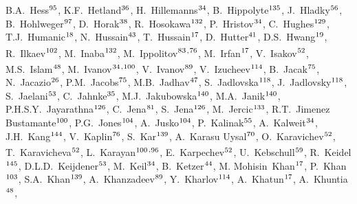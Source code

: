 \begin{flushleft}
B.A.~Hess$^\textrm{\scriptsize 95}$,
K.F.~Hetland$^\textrm{\scriptsize 36}$,
H.~Hillemanns$^\textrm{\scriptsize 34}$,
B.~Hippolyte$^\textrm{\scriptsize 135}$,
J.~Hladky$^\textrm{\scriptsize 56}$,
B.~Hohlweger$^\textrm{\scriptsize 97}$,
D.~Horak$^\textrm{\scriptsize 38}$,
R.~Hosokawa$^\textrm{\scriptsize 132}$,
P.~Hristov$^\textrm{\scriptsize 34}$,
C.~Hughes$^\textrm{\scriptsize 129}$,
T.J.~Humanic$^\textrm{\scriptsize 18}$,
N.~Hussain$^\textrm{\scriptsize 43}$,
T.~Hussain$^\textrm{\scriptsize 17}$,
D.~Hutter$^\textrm{\scriptsize 41}$,
D.S.~Hwang$^\textrm{\scriptsize 19}$,
R.~Ilkaev$^\textrm{\scriptsize 102}$,
M.~Inaba$^\textrm{\scriptsize 132}$,
M.~Ippolitov$^\textrm{\scriptsize 83}$\textsuperscript{,}$^\textrm{\scriptsize 76}$,
M.~Irfan$^\textrm{\scriptsize 17}$,
V.~Isakov$^\textrm{\scriptsize 52}$,
M.S.~Islam$^\textrm{\scriptsize 48}$,
M.~Ivanov$^\textrm{\scriptsize 34}$\textsuperscript{,}$^\textrm{\scriptsize 100}$,
V.~Ivanov$^\textrm{\scriptsize 89}$,
V.~Izucheev$^\textrm{\scriptsize 114}$,
B.~Jacak$^\textrm{\scriptsize 75}$,
N.~Jacazio$^\textrm{\scriptsize 26}$,
P.M.~Jacobs$^\textrm{\scriptsize 75}$,
M.B.~Jadhav$^\textrm{\scriptsize 47}$,
S.~Jadlovska$^\textrm{\scriptsize 118}$,
J.~Jadlovsky$^\textrm{\scriptsize 118}$,
S.~Jaelani$^\textrm{\scriptsize 53}$,
C.~Jahnke$^\textrm{\scriptsize 35}$,
M.J.~Jakubowska$^\textrm{\scriptsize 140}$,
M.A.~Janik$^\textrm{\scriptsize 140}$,
P.H.S.Y.~Jayarathna$^\textrm{\scriptsize 126}$,
C.~Jena$^\textrm{\scriptsize 81}$,
S.~Jena$^\textrm{\scriptsize 126}$,
M.~Jercic$^\textrm{\scriptsize 133}$,
R.T.~Jimenez Bustamante$^\textrm{\scriptsize 100}$,
P.G.~Jones$^\textrm{\scriptsize 104}$,
A.~Jusko$^\textrm{\scriptsize 104}$,
P.~Kalinak$^\textrm{\scriptsize 55}$,
A.~Kalweit$^\textrm{\scriptsize 34}$,
J.H.~Kang$^\textrm{\scriptsize 144}$,
V.~Kaplin$^\textrm{\scriptsize 76}$,
S.~Kar$^\textrm{\scriptsize 139}$,
A.~Karasu Uysal$^\textrm{\scriptsize 70}$,
O.~Karavichev$^\textrm{\scriptsize 52}$,
T.~Karavicheva$^\textrm{\scriptsize 52}$,
L.~Karayan$^\textrm{\scriptsize 100}$\textsuperscript{,}$^\textrm{\scriptsize 96}$,
E.~Karpechev$^\textrm{\scriptsize 52}$,
U.~Kebschull$^\textrm{\scriptsize 59}$,
R.~Keidel$^\textrm{\scriptsize 145}$,
D.L.D.~Keijdener$^\textrm{\scriptsize 53}$,
M.~Keil$^\textrm{\scriptsize 34}$,
B.~Ketzer$^\textrm{\scriptsize 44}$,
M. Mohisin~Khan$^\textrm{\scriptsize 17}$,
P.~Khan$^\textrm{\scriptsize 103}$,
S.A.~Khan$^\textrm{\scriptsize 139}$,
A.~Khanzadeev$^\textrm{\scriptsize 89}$,
Y.~Kharlov$^\textrm{\scriptsize 114}$,
A.~Khatun$^\textrm{\scriptsize 17}$,
A.~Khuntia$^\textrm{\scriptsize 48}$,

\end{flushleft}
